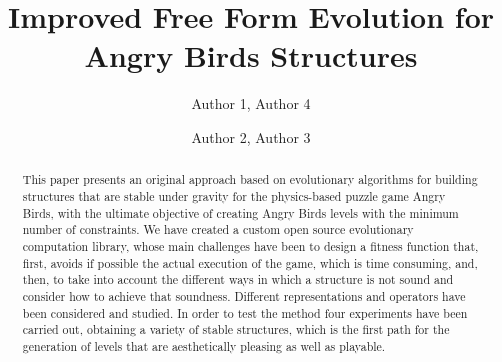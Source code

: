 \documentclass[sigconf]{acmart}
\begin{document}
\title{Improved Free Form Evolution for Angry Birds Structures}

\author{Author 1, Author 4}

\author{Author 2, Author 3}

\renewcommand{\shortauthors}{Author 1 et al.}


\begin{abstract}
This paper presents an original approach based on evolutionary algorithms for building structures that
are stable under gravity for the physics-based puzzle game Angry
Birds, with the ultimate objective of creating
Angry Birds levels with the minimum number of constraints.
We have created a custom open source evolutionary computation library,
whose main challenges have been to design a fitness function that, first, avoids if
possible the actual execution of the game, which is time
consuming, and, then, to take into account the different ways in which
a structure is not sound and consider how to achieve that soundness. Different 
representations and operators have been considered and studied. In
order to test the method four experiments have been carried out,
obtaining a variety of stable structures, which is the first path for
the generation of levels that are aesthetically pleasing as well as
playable. 
\end{abstract}
\end{document}
